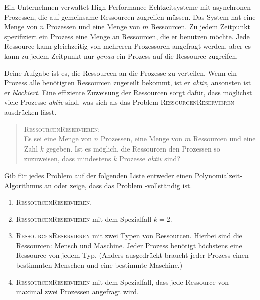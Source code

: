 \documentclass{uebung_cs}
\begin{document}
\begin{aufgabe}[Ressourcenmanagement]
	Ein Unternehmen verwaltet High-Performance Echtzeitsysteme mit asynchronen Prozessen, die auf gemeinsame Ressourcen zugreifen müssen. Das System hat eine Menge von $n$ Prozessen und eine Menge von $m$ Ressourcen. 
	Zu jedem Zeitpunkt spezifiziert ein Prozess eine Menge an Ressourcen, die er benutzen möchte. Jede Ressource kann gleichzeitig von mehreren Prozessoren angefragt werden, aber es kann zu jedem Zeitpunkt nur \emph{genau} ein Prozess auf die Ressource zugreifen. 
	
	Deine Aufgabe ist es, die Ressourcen an die Prozesse zu verteilen. Wenn ein Prozess alle benötigten Ressourcen zugeteilt bekommt, ist er \textit{aktiv}, ansonsten ist er \textit{blockiert}. Eine effiziente Zuweisung der Ressourcen sorgt dafür, dass möglichst viele Prozesse \textit{aktiv} sind, was sich als das Problem \textsc{RessourcenReservieren} ausdrücken lässt.
	 \begin{quote}
	 \textsc{RessourcenReservieren}:\\
	 Es sei eine Menge von $n$ Prozessen, eine Menge von $m$ Ressourcen und eine Zahl $k$ gegeben. Ist es möglich, die Ressourcen den Prozessen so zuzuweisen, dass mindestens $k$ Prozesse \textit{aktiv} sind?
	 \end{quote}
	 
	Gib für jedes Problem auf der folgenden Liste entweder einen Polynomialzeit-Algorithmus an oder zeige, dass das Problem \NP-vollständig ist.
	 \begin{enumerate}
	 	\item \textsc{RessourcenReservieren}.
	 	\item \textsc{RessourcenReservieren} mit dem Spezialfall $k=2$.
	 	\item \textsc{RessourcenReservieren} mit zwei Typen von Ressourcen. Hierbei sind die Ressourcen: Mensch und Maschine. Jeder Prozess benötigt höchstens eine Ressource von jedem Typ. (Anders ausgedrückt braucht jeder Prozess einen bestimmten Menschen und eine bestimmte Maschine.)
	 	\item \textsc{RessourcenReservieren} mit dem Spezialfall, dass jede Ressource von maximal zwei Prozessen angefragt wird.	 	
	 \end{enumerate}
\end{aufgabe}
\end{document}
